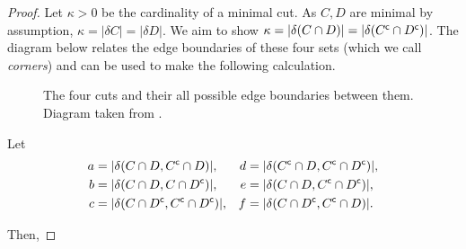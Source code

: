 \begin{proof}
    Let \(\kappa>0\) be the cardinality of a minimal cut. As \(C, D\) are minimal by assumption, \(\kappa = |\delta C| = |\delta D|\).
    We aim to show \(\kappa = |\delta(C \cap D)| = |\delta({C}^{\mathsf{c}} \cap {D}^{\mathsf{c}})|\).
    The diagram below relates the edge boundaries of these four sets (which we call \emph{corners}) and can be used to make the following calculation.

    \begin{figure}[h]
    \centering
    \caption{The four cuts and their all possible edge boundaries between them. Diagram taken from \cite[p.~4]{Kr90}.}
    \label{fig:cuts}
    \end{figure}

    Let 
    \begin{align*}
        a &= |\delta(C \cap D, {C}^{\mathsf{c}} \cap D)|, & d &= |\delta({C}^{\mathsf{c}} \cap D, {C}^{\mathsf{c}} \cap {D}^{\mathsf{c}})|, \\
        b &= |\delta(C \cap D, C \cap {D}^{\mathsf{c}})|, & e &= |\delta(C \cap D, {C}^{\mathsf{c}} \cap {D}^{\mathsf{c}})|, \\
        c &= |\delta(C \cap {D}^{\mathsf{c}}, {C}^{\mathsf{c}} \cap {D}^{\mathsf{c}})|, & f &= |\delta(C \cap {D}^{\mathsf{c}}, {C}^{\mathsf{c}} \cap D)|.
    \end{align*}

    Then, 


\end{proof}
